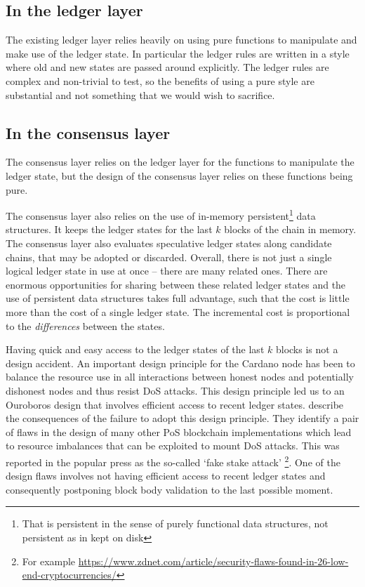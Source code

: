 \documentclass[11pt,a4paper]{article}
\begin{document}
\subsection{In the ledger layer}
\label{ledger-state-handling-in-the-current-ledger-layer}

The existing ledger layer relies heavily on using pure functions to manipulate
and make use of the ledger state. In particular the ledger rules are written in
a style where old and new states are passed around explicitly. The ledger rules
are complex and non-trivial to test, so the benefits of using a pure style are
substantial and not something that we would wish to sacrifice.

\subsection{In the consensus layer}
\label{ledger-state-handling-in-the-current-consensus-layer}

The consensus layer relies on the ledger layer for the functions to manipulate
the ledger state, but the design of the consensus layer relies on these
functions being pure.

The consensus layer also relies on the use of in-memory
persistent\footnote{That is persistent in the sense of purely functional data
structures, not persistent as in kept on disk} data structures. It keeps the
ledger states for the last $k$ blocks of the chain in memory. The consensus
layer also evaluates speculative ledger states along candidate chains, that may
be adopted or discarded. Overall, there is not just a single logical ledger
state in use at once -- there are many related ones. There are enormous
opportunities for sharing between these related ledger states and the use of
persistent data structures takes full advantage, such that the cost is little
more than the cost of a single ledger state. The incremental cost is
proportional to the \emph{differences} between the states.

Having quick and easy access to the ledger states of the last $k$ blocks is not
a design accident. An important design principle for the Cardano node has been
to balance the resource use in all interactions between honest nodes and
potentially dishonest nodes and thus resist DoS attacks. This design principle
led us to an Ouroboros design that involves efficient access to recent ledger
states. \cite{fake-stake} describe the consequences of the failure to adopt
this design principle. They identify a pair of flaws in the design of many
other PoS blockchain implementations which lead to resource imbalances that can
be exploited to mount DoS attacks. This was reported in the popular press as
the so-called `fake stake attack'%
\footnote{For example \url{https://www.zdnet.com/article/security-flaws-found-in-26-low-end-cryptocurrencies/}}.
One of the design flaws involves not having efficient access to recent ledger
states and consequently postponing block body validation to the last possible
moment.
\end{document}
